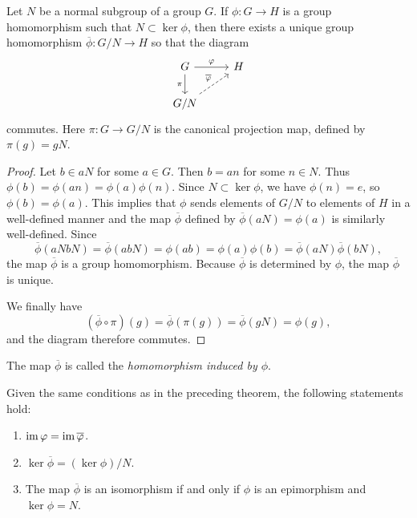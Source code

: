 \begin{theorem}
    \label{thm:induced-homomorphism}
    Let \(N\) be a normal subgroup of a group \(G\). If \(\phi: G \to H\) is a
    group homomorphism such that \(N \subset \ker \phi\), then there exists a
    unique group homomorphism \(\overline{\phi}: G/N \to H\) so that the diagram
    \[
        \begin{tikzcd}
            G \arrow{r}{\phi} \arrow[swap]{d}{\pi} & H \\
            G/N \arrow[dashed]{ur}{\overline{\phi}}
        \end{tikzcd}
    \]
    commutes. Here \(\pi: G \to G/N\) is the canonical projection map, defined
    by \(\pi(g) = gN\).
\end{theorem}

\begin{proof}
    Let \(b \in aN\) for some \(a \in G\). Then \(b = an\) for some \(n \in N\).
    Thus \(\phi(b) = \phi(an) = \phi(a)\phi(n)\). Since \(N \subset \ker \phi\),
    we have \(\phi(n) = e\), so \(\phi(b) = \phi(a)\). This implies that
    \(\phi\) sends elements of \(G/N\) to elements of \(H\) in a well-defined
    manner and the map \(\overline{\phi}\) defined by \(\overline{\phi}(aN) =
    \phi(a)\) is similarly well-defined. Since
    \[
    \overline{\phi}(aNbN) = \overline{\phi}(abN) = \phi(ab) = \phi(a)\phi(b) = \overline{\phi}(aN)\overline{\phi}(bN),
    \]
    the map \(\overline{\phi}\) is a group homomorphism. Because
    \(\overline{\phi}\) is determined by \(\phi\), the map \(\overline{\phi}\)
    is unique.

    We finally have
    \[
        (\overline{\phi} \circ \pi)(g) = \overline{\phi}(\pi(g)) = \overline{\phi}(gN) = \phi(g),
    \]
    and the diagram therefore commutes.
\end{proof}

\begin{remark}
    The map \(\overline{\phi}\) is called the \emph{homomorphism induced by
    \(\phi\)}.
\end{remark}

\begin{theorem}
    Given the same conditions as in the preceding theorem, the following
    statements hold:
    \begin{enumerate}[label=(\alph*)]
        \item \(\operatorname{im} \varphi = \operatorname{im} \overline{\varphi}\).
        \item \(\ker \overline{\phi} = (\ker \phi)/N\).
        \item The map \(\overline{\phi}\) is an isomorphism if and only if
        \(\phi\) is an epimorphism and \(\ker \phi = N\).
    \end{enumerate}
\end{theorem}

